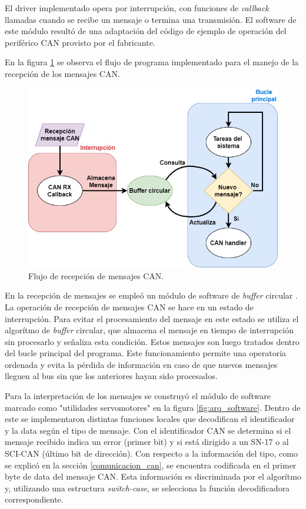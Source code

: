 El driver implementado opera por interrupción, con funciones de \textit{callback} llamadas cuando se recibe un mensaje o termina una transmisión. El software de este módulo resultó de una adaptación del código de ejemplo de operación del periférico CAN provisto por el fabricante.

En la figura \ref{fig:can_handler} se observa el flujo de programa implementado para el manejo de la recepción de los mensajes CAN.

\begin{figure}[htbp]
	\centering
	\includegraphics[scale=.5]{./Figures/Can_handler.png}
	\caption{Flujo de recepción de mensajes CAN.}
	\label{fig:can_handler}
\end{figure}

En la recepción de mensajes se empleó un módulo de software de \textit{buffer} circular \citep{tpf_gabriel}. La operación de recepción de mensajes CAN se hace en un estado de interrupción. Para evitar el procesamiento del mensaje en este estado se utiliza el algorítmo de \textit{buffer} circular, que almacena el mensaje en tiempo de interrupción sin procesarlo y señaliza esta condición. Estos mensajes son luego tratados dentro del bucle principal del programa. Este funcionamiento permite una operatoria ordenada y evita la pérdida de información en caso de que nuevos mensajes lleguen al bus sin que los anteriores hayan sido procesados.

Para la interpretación de los mensajes se construyó el módulo de software marcado como "utilidades servomotores" en la figura \ref{fig:arq_software}. Dentro de este se implementaron distintas funciones locales que decodifican el identificador y la data según el tipo de mensaje. Con el identificador CAN se determina si el mensaje recibido indica un error (primer bit) y si está dirigido a un SN-17 o al SCI-CAN (último bit de dirección). Con respecto a la información del tipo, como se explicó en la sección \ref{comunicacion_can}, se encuentra codificada en el primer byte de data del mensaje CAN. Esta información es discriminada por el algorítmo y, utilizando una estructura \textit{switch-case}, se selecciona la función decodificadora correspondiente.


